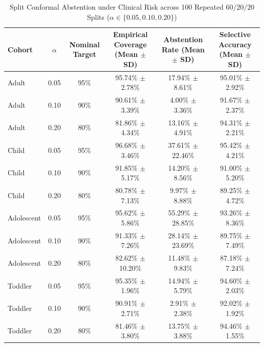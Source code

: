 \begin{table}[t]
\centering
\caption{Split Conformal Abstention under Clinical Risk across 100 Repeated $60/20/20$ Splits ($\alpha \in \{0.05, 0.10, 0.20\}$)}
\label{tab:conformal_abstention}
\footnotesize
\setlength{\tabcolsep}{3pt}
\begin{tabular*}{\textwidth}{|@{\extracolsep{\fill}}l|c|c|c|c|c|}
\hline
\textbf{Cohort} & $\alpha$ & \textbf{Nominal Target} & \textbf{Empirical Coverage (Mean $\pm$ SD)} & \textbf{Abstention Rate (Mean $\pm$ SD)} & \textbf{Selective Accuracy (Mean $\pm$ SD)} \\
\hline
Adult & 0.05 & 95\% & 95.74\% $\pm$ 2.78\% & 17.94\% $\pm$ 8.61\% & 95.01\% $\pm$ 2.92\% \\
\hline
Adult & 0.10 & 90\% & 90.61\% $\pm$ 3.39\% & 4.00\% $\pm$ 3.36\% & 91.67\% $\pm$ 2.37\% \\
\hline
Adult & 0.20 & 80\% & 81.86\% $\pm$ 4.34\% & 13.16\% $\pm$ 4.91\% & 94.31\% $\pm$ 2.21\% \\
\hline
Child & 0.05 & 95\% & 96.68\% $\pm$ 3.46\% & 37.61\% $\pm$ 22.46\% & 95.42\% $\pm$ 4.21\% \\
\hline
Child & 0.10 & 90\% & 91.85\% $\pm$ 5.17\% & 14.20\% $\pm$ 8.56\% & 91.00\% $\pm$ 5.20\% \\
\hline
Child & 0.20 & 80\% & 80.78\% $\pm$ 7.13\% & 9.97\% $\pm$ 8.88\% & 89.25\% $\pm$ 4.72\% \\
\hline
Adolescent & 0.05 & 95\% & 95.62\% $\pm$ 5.86\% & 55.29\% $\pm$ 28.85\% & 93.26\% $\pm$ 8.36\% \\
\hline
Adolescent & 0.10 & 90\% & 91.33\% $\pm$ 7.26\% & 28.14\% $\pm$ 23.69\% & 89.75\% $\pm$ 7.49\% \\
\hline
Adolescent & 0.20 & 80\% & 82.62\% $\pm$ 10.20\% & 11.48\% $\pm$ 9.83\% & 87.18\% $\pm$ 7.24\% \\
\hline
Toddler & 0.05 & 95\% & 95.35\% $\pm$ 1.96\% & 14.94\% $\pm$ 5.79\% & 94.60\% $\pm$ 2.03\% \\
\hline
Toddler & 0.10 & 90\% & 90.91\% $\pm$ 2.71\% & 2.91\% $\pm$ 2.38\% & 92.02\% $\pm$ 1.92\% \\
\hline
Toddler & 0.20 & 80\% & 81.46\% $\pm$ 3.80\% & 13.75\% $\pm$ 3.88\% & 94.46\% $\pm$ 1.55\% \\
\hline
\end{tabular*}
\vspace{-2mm}
\end{table}


